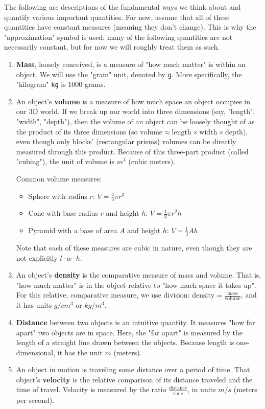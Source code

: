 \documentclass{ximera}
\begin{document}
The following are descriptions of the fundamental ways we think about and quantify various important quantities. For now, assume that all of these quantities have constant measures (meaning they don't change). This is why the "approximation" symbol is used; many of the following quantities are not necessarily constant, but for now we will roughly treat them as such.

\begin{enumerate}
    \item \textbf{Mass}, loosely conceived, is a measure of "how much matter" is within an object. We will use the "gram" unit, denoted by \texttt{g}. More specifically, the "kilogram" \texttt{kg} is 1000 grams.
    
    \item An object's \textbf{volume} is a measure of how much space an object occupies in our 3D world. If we break up our world into three dimensions (say, "length", "width", "depth"), then the volume of an object can be loosely thought of as the product of its three dimensions (so $\text{volume} \approx \text{length} \times \text{width} \times \text{depth}$), even though only blocks' (rectangular prisms) volumes can be directly measured through this product. Because of this three-part product (called "cubing"), the unit of volume is $m^3$ (cubic meters).

    Common volume measures:
    \begin{itemize}
        \item Sphere with radius $r$: $V = \frac{4}{3} \pi r^3$
        \item Cone with base radius $r$ and height $h$: $V = \frac{1}{3} \pi r^2 h$
        \item Pyramid with a base of area $A$ and height $h$: $V = \frac{1}{3} A h$
    \end{itemize}

    Note that each of these measures are cubic in nature, even though they are not explicitly $l \cdot w \cdot h$.

    \item An object's \textbf{density} is the comparative measure of mass and volume. That is, "how much matter" is in the object relative to "how much space it takes up". For this relative, comparative measure, we use division: $\text{density} = \frac{\text{mass}}{\text{volume}}$, and it has units $g/cm^3$ or $kg/m^3$.

    \item \textbf{Distance} between two objects is an intuitive quantity. It measures "how far apart" two objects are in space. Here, the "far apart" is measured by the length of a straight line drawn between the objects. Because length is one-dimensional, it has the unit $m$ (meters).

    \item An object in motion is traveling some distance over a period of time. That object's \textbf{velocity} is the relative comparison of its distance traveled and the time of travel. Velocity is measured by the ratio $\frac{\text{distance}}{\text{time}}$, in units $m/s$ (meters per second).
\end{enumerate}
\end{document}
